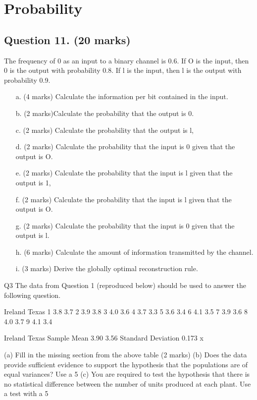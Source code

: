 \documentclass[]{report}
\begin{document}
\section{Probability}
\subsection*{Question 11. (20 marks) }

The frequency of 0 as an input to a binary channel is 0.6. If O is the
input, then 0 is the output with probability 0.8. If l is the input, then l
is the output with probability 0.9.
\begin{itemize}
	\item[a.](4 marks) Calculate the information per bit contained in the input.
	\item[b.](2 marks)Calculate the probability that the output is 0.
	\item[c.](2 marks) Calculate the probability that the output is l,
	\item[d.](2 marks) Calculate the probability that the input is 0 given that the
	output is O.
	\item[e.](2 marks) Calculate the probability that the input is l given that
	the output is 1,
	\item[f.](2 marks) Calculate the probability that the input is l given that
	the output is O.
	\item[g.](2 marks) Calculate the probability that the input is 0 given that
	the output is l.
	\item[h.](6 marks) Calculate the amount of information transmitted by the channel.
	\item[i.](3 marks) Derive the globally optimal reconstruction rule.
\end{itemize}



\newpage





















Q3
The data from Question 1 (reproduced below) should be used to answer the following question.

Ireland	Texas
1	3.8	3.7
2	3.9	3.8
3	4.0	3.6
4	3.7	3.3
5	3.6	3.4
6	4.1	3.5
7	3.9	3.6
8	4.0	3.7
9	4.1	3.4



Ireland	Texas
Sample Mean	3.90	3.56
Standard Deviation	0.173	x

(a)	Fill in the missing section from the above table			(2 marks)
(b)	Does the data provide sufficient evidence to support the hypothesis that the populations are of equal variances?  Use a 5%
(c)	You are required to test the hypothesis that there is no statistical difference between the number of units produced at each plant.  Use a test with a 5%
\end{document}
